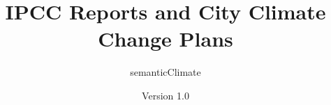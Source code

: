\documentclass[11pt]{book}
\title{IPCC Reports and City Climate Change Plans}
\author{semanticClimate}
\date{Version 1.0}
\begin{document}
\maketitle
\def\title#1{\chapter{#1}}
\tableofcontents

        
        
\end{document}
